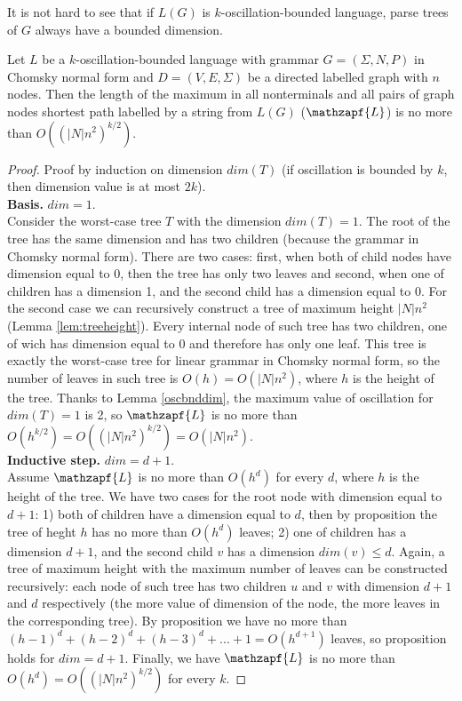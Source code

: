 It is not hard to see that if $L(G)$ is $k$-oscillation-bounded language, parse trees of $G$ always have a bounded dimension.
\begin{lemma}
\label{oscbnddim}
Let $L$ be a $k$-oscillation-bounded language with grammar $G = (\Sigma, N, P)$ in Chomsky normal form and $D=(V, E, \Sigma)$ be a directed labelled graph with $n$ nodes. Then the length of the maximum in all nonterminals and all pairs of graph nodes shortest path labelled by a string from $L(G)$ ($\mathzapf{L}$) is no more than $O((|N|n^2)^{k/2})$.
\end{lemma}
\begin{proof}
Proof by induction on dimension $dim(T)$ (if oscillation is bounded by $k$, then dimension value is at most $2k$).
\\
\textbf{Basis.} $dim = 1$.
\\
Consider the worst-case tree $T$ with the dimension $dim(T) = 1$. The root of the tree has the same dimension and has two children (because the grammar in Chomsky normal form). There are two cases:  first, when both of child nodes have dimension equal to 0, then the tree has only two leaves and second, when one of children has a dimension 1, and the second child has a dimension equal to 0. For the second case we can recursively construct a tree of maximum height $|N|n^2$ (Lemma \ref{lem:treeheight}). Every internal node of such tree has two children, one of wich has dimension equal to 0 and therefore has only one leaf. This tree is exactly the worst-case tree for linear grammar in Chomsky normal form, so the number of leaves in such tree is $O(h) = O(|N|n^2)$, where $h$ is the height of the tree. Thanks to Lemma \ref{oscbnddim}, the maximum value of oscillation for $dim(T) = 1$ is 2, so $\mathzapf{L}$ is no more than $O(h^{k/2}) = O((|N|n^2)^{k/2}) = O(|N|n^2)$.
\\
\textbf{Inductive step.} $dim = d + 1$.
\\
Assume $\mathzapf{L}$ is no more than $O(h^{d})$ for every $d$, where $h$ is the height of the tree. We have two cases for the root node with dimension equal to $d+1$: 1) both of children have a dimension equal to $d$, then by proposition the tree of heght $h$ has no more than $O(h^{d})$ leaves; 2) one of children has a dimension $d + 1$, and the second child $v$ has a dimension $dim(v) \le d$. Again, a tree of maximum height with the maximum number of leaves can be constructed recursively:  each node of such tree has two children $u$ and $v$ with dimension $d+1$ and $d$ respectively (the more value of dimension of the node, the more leaves in the corresponding tree). By proposition we have no more than $(h-1)^d + (h-2)^d + (h-3)^d + ... + 1 = O(h^{d+1})$ leaves, so proposition holds for $dim = d+1$. Finally, we have $\mathzapf{L}$ is no more than $O(h^{d}) = O((|N|n^2)^{k/2})$ for every $k$.
\end{proof}


